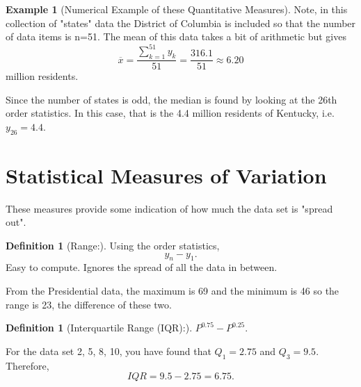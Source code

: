 \documentclass[10pt,]{book}
\theoremstyle{plain}
\theoremstyle{definition}
\newtheorem{definition}[theorem]{Definition}
\theoremstyle{definition}
\newtheorem{example}[theorem]{Example}
\theoremstyle{definition}
\numberwithin{equation}{section}
\begin{document}
\begin{example}[Numerical Example of these Quantitative Measures]
		Note, in this collection of "states" data the District of Columbia is included so that the number of data items is n=51. The mean of this data takes a bit of arithmetic but gives
		\begin{equation*}\overline{x} = \frac{\sum_{k=1}^{51} y_k }{51} = \frac{316.1}{51} \approx 6.20\end{equation*}
		million residents. 
\par

		Since the number of states is odd, the median is found by looking at the 26th order statistics. In this case, that is the 4.4 million residents of Kentucky, i.e. \(y_{26} = 4.4\).
\end{example}
\typeout{************************************************}
\typeout{************************************************}
\section[{Statistical Measures of Variation}]{Statistical Measures of Variation}\label{section-5}
These measures provide some indication of how much the data set is "spread out".
%
\begin{definition}[{Range:}]\label{definition-10}
Using the order statistics, \begin{equation*}y_n - y_1.\end{equation*}  
Easy to compute. Ignores the spread of all the data in between.
%
\end{definition}
\par
From the Presidential data, the maximum is 69 and the minimum is 46 so the range is 23, the difference of these two. %
\begin{definition}[{Interquartile Range (IQR):}]\label{definition-11}
\(P^{0.75} - P^{0.25}\). 
%
\end{definition}
\par

For the data set {2, 5, 8, 10}, you have found that \(Q_1 = 2.75\) and \(Q_3 = 9.5\). Therefore, \begin{equation*}IQR = 9.5 - 2.75 = 6.75.\end{equation*}
%
\par
\end{document}
